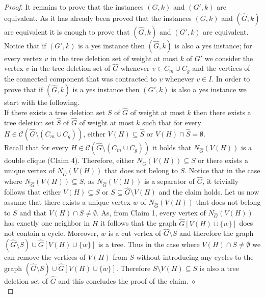 \documentclass[a4paper,11pt]{article}
\newcommand{\cc}{{\mathcal{C}}}
\begin{document}
\begin{proof}
\noindent 
It remains to prove that the instances $(G,k)$ and $(G',k)$ are equivalent. 
As it has already been proved that the instances $(G,k)$ and $(\widehat{G},k)$ are equivalent
it is enough to prove that $(\widehat{G},k)$ and $(G',k)$ are equivalent.
Notice that if $(G',k)$ is a yes instance then $(\widehat{G},k)$ is also a yes instance; for every vertex $v$ in the tree deletion set of weight at most $k$ of $G'$
we consider the vertex $v$ in the tree deletion set of $\widehat{G}$ whenever $v\in C_{m}\cup C_{g}$ 
and the vertices of the connected component that was contracted to $v$ whenever $v\in I$.  
In order to prove that if $(\widehat{G},k)$ is a yes instance then $(G',k)$ is also a yes instance we start with the 
following. \\

 If there exists a tree deletion set $S$ of $\widehat{G}$ of weight at most $k$ then there exists a tree deletion set $\widehat{S}$ of $\widehat{G}$ 
of weight at most $k$ such that for every $H\in \cc(\widehat{G}\setminus (C_{m}\cup C_{g}))$, either $V(H)\subseteq \widehat{S}$ or $V(H)\cap \widehat{S}=\emptyset$.\\

 Recall that for every $H\in \cc(\widehat{G}\setminus (C_{m}\cup C_{g}))$ 
it holds that $N_{\widehat{G}}(V(H))$ is a double clique (Claim 4).
Therefore, either $N_{\widehat{G}}(V(H))\subseteq S$ or there exists a unique vertex of $N_{\widehat{G}}(V(H))$ that does not belong to $S$.
Notice that in the case where $N_{\widehat{G}}(V(H))\subseteq S$, as $N_{\widehat{G}}(V(H))$ is a separator of $\widehat{G}$, 
it trivially follows that either $V(H)\subseteq S$ or $S\subseteq\widehat{G}\setminus V(H)$ and the claim holds. Let us now assume that there exists a unique vertex $w$ of 
$N_{\widehat{G}}(V(H))$ that does not belong to $S$ and that $V(H)\cap S\neq \emptyset$. As, from Claim 1, every vertex of $N_{\widehat{G}}(V(H))$ has exactly
one neighbor in $H$ it follows that the graph $\widehat{G}[V(H)\cup \{w\}]$ does not contain a cycle.
Moreover, $w$ is a cut vertex of $\widehat{G}\setminus S$ and therefore the graph $(\widehat{G}\setminus S)\cup \widehat{G}[V(H)\cup \{w\}]$ is a tree.
Thus in the case where $V(H)\cap S\neq \emptyset$ we can remove the vertices of $V(H)$ from $S$ 
without introducing any cycles to the graph $(\widehat{G}\setminus S)\cup \widehat{G}[V(H)\cup \{w\}]$.
Therefore $S\setminus V(H)\subseteq S$ is also a tree deletion set of $\widehat{G}$ and this concludes the proof of the claim.
\hfill $\diamond$\\


\end{proof}
\end{document}
